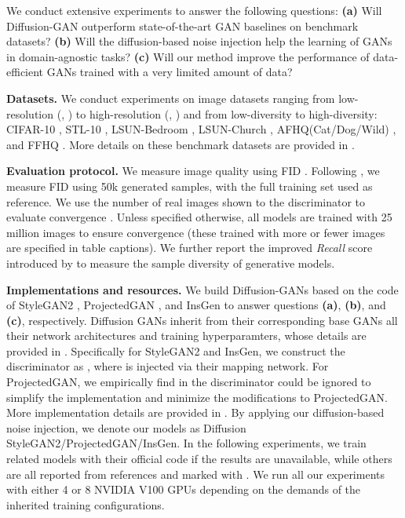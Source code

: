 \documentclass{article} \usepackage{iclr2023_conference,times}
\theoremstyle{plain}
\theoremstyle{definition}
\theoremstyle{remark}
\begin{document}
We conduct extensive experiments to answer the following questions: \textbf{(a)} Will Diffusion-GAN outperform state-of-the-art GAN baselines on benchmark datasets?
\textbf{(b)} Will the diffusion-based noise injection help the learning of GANs in domain-agnostic tasks?
\textbf{(c)} Will our method improve the performance of data-efficient GANs trained with a very limited amount of data?

\textbf{Datasets. } We conduct experiments on image datasets ranging from low-resolution (, ) to high-resolution (, ) and from low-diversity to high-diversity: CIFAR-10 \citep{krizhevsky2009learning}, STL-10 \citep{coates2011analysis}, LSUN-Bedroom \citep{yu2015lsun}, LSUN-Church \citep{yu2015lsun}, AFHQ(Cat/Dog/Wild) \citep{Choi2020StarGANVD}, and FFHQ \citep{karras2019style}. More details on these benchmark datasets are provided in .



\textbf{Evaluation protocol. } We measure image quality using FID \citep{heusel2017gans}. Following \citet{karras2019style, karras2020analyzing}, we measure FID using 50k generated samples, with the full training set used as reference. 
We use the number of real images shown to the discriminator to evaluate convergence \citep{karras2020training,sauer2021projected}. Unless  specified otherwise, all models are trained with 25 million images to ensure convergence (these trained with more or fewer images are specified in table captions).
We further report the improved \textit{Recall} score introduced by 
\citet{kynkaanniemi2019improved} to measure the sample diversity of generative models. 

\textbf{Implementations and resources. } We build Diffusion-GANs based on the code of StyleGAN2 \citep{karras2020analyzing}, ProjectedGAN \citep{sauer2021projected}, and InsGen \citep{yang2021data} to answer questions \textbf{(a)}, \textbf{(b)}, and \textbf{(c)}, respectively.
Diffusion GANs inherit from their corresponding base GANs all their network architectures and training hyperparamters, whose details are provided in .  
Specifically for StyleGAN2 and InsGen, we construct the discriminator as , where  is injected via their mapping network. 
For ProjectedGAN, we empirically find  in the discriminator could be ignored to simplify the implementation and minimize the modifications to ProjectedGAN. More implementation details are provided in .
By applying our diffusion-based noise injection, we denote our models as Diffusion StyleGAN2/ProjectedGAN/InsGen. 
In the following experiments, we train related models with their official code if the results are unavailable, while others are all reported from references and marked with .
We run all our experiments with either 4 or 8 NVIDIA V100 GPUs depending on the demands of the inherited training configurations. 
\end{document}
